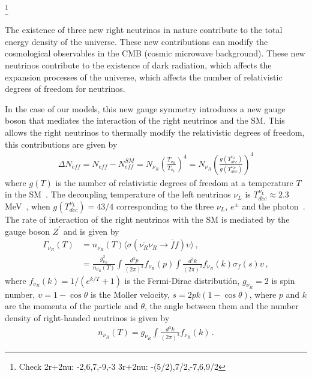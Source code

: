 \documentclass[12pt]{article}
\begin{document}
\footnote{Check 2r+2nu: -2,6,7,-9,-3  3r+2nu: -(5/2),7/2,-7,6,9/2}

The existence of three new right neutrinos in nature contribute to the total energy density of the universe. These new contributions can modify the cosmological observables in the CMB (cosmic microwave background). These new neutrinos contribute to the existence of dark radiation, which affects the expansion processes of the universe, which affects the number of relativistic degrees of freedom for neutrinos.

In the case of our models, this new gauge symmetry introduces a new gauge boson that mediates the interaction of the right neutrinos and the SM. This allows the right neutrinos to thermally modify the relativistic degrees of freedom, this contributions are given by~\cite{Anchordoqui:2012qu, Anchordoqui:2011nh}
%
\begin{align*}
    \Delta N_{eff} = N_{eff} - N^{SM}_{eff} = N_{\nu_R} \left( \frac{T_{\nu_{R}}}{T_{\nu_{L}}} \right)^{4} = N_{\nu_R} \left( \frac{g(T^{\nu_{L}}_{dec})}{g(T^{\nu_{R}}_{dec})} \right)^{4}
\end{align*}
%
where $ g(T) $ is the number of relativistic degrees of freedom at a temperature $T$ in the SM~\cite{Aghanim:2018eyx}. The decoupling temperature of the left neutrinos $\nu_L$ is $ T^{\nu_{L}}_{dec} \approx 2.3 $ MeV~\cite{Enqvist:1991gx}, when $g(T^{\nu_{L}}_{ dec}) = 43/4 $ corresponding to the three $\nu_{L}$, $e^{\pm} $ and the photon~\cite{Kolb:1990vq}. The rate of interaction of the right neutrinos with the SM is mediated by the gauge boson $Z^{\prime} $ and is given by~\cite{SolagurenBeascoa:2012cz}
%
\begin{align*}
    \Gamma_{\nu_R} (T) &= n_{\nu_R}(T) \langle \sigma(\overline{\nu_{R}} \nu_{R} \to \overline{f} f) \upsilon \rangle \,, \\
    &= \frac{g^{2}_{\nu_R}}{n_{\nu_R}(T)} \int \frac{d^{3} p}{(2 \pi)^{3}} f_{\nu_R}(p) \int \frac{d^{3} k}{(2 \pi)^{3}} f_{\nu_R}(k) \sigma_{f}(s) \upsilon\,,
\end{align*}
%
where $f_{\nu_R}(k)=1/(e^{k/T}+1)$ is the Fermi-Dirac distributión, $g_{\nu_R} = 2$ is spin number, $\upsilon = 1-\cos{\theta}$ is the Moller velocity, $s = 2 p k (1-\cos{\theta})$, where $p$ and $k$ are the momenta of the particle and $\theta$, the angle between them and the number density of right-handed neutrinos is given by
\begin{align*}
n_{\nu_R}(T) = g_{\nu_R} \int \frac{d^{3} k}{(2 \pi)^{3}} f_{\nu_R}(k)\,.
\end{align*}
\end{document}

